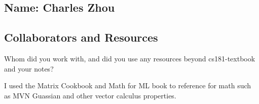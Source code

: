 \documentclass[submit]{../harvardml}
\begin{document}
\newpage
\subsection*{Name: Charles Zhou}

\subsection*{Collaborators and Resources}
Whom did you work with, and did you use any resources beyond cs181-textbook and your notes?

I used the Matrix Cookbook and Math for ML book to reference for math such as MVN Guassian and other vector calculus properties.
\end{document}
